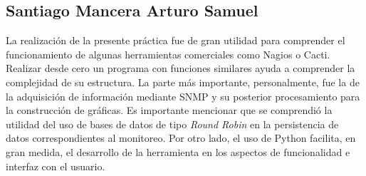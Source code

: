 \subsection{Santiago Mancera Arturo Samuel}
La realización de la presente práctica fue de gran utilidad para comprender el funcionamiento de algunas herramientas comerciales como Nagios o Cacti. Realizar desde cero un programa con funciones similares ayuda a comprender la complejidad de su estructura.
La parte más importante, personalmente, fue la de la adquisición de información mediante SNMP y su posterior procesamiento para la construcción de gráficas. Es importante mencionar que se comprendió la utilidad del uso de bases de datos de tipo \textit{Round Robin} en la persistencia de datos correspondientes al monitoreo.
Por otro lado, el uso de Python facilita, en gran medida, el desarrollo de la herramienta en los aspectos de funcionalidad e interfaz con el usuario.